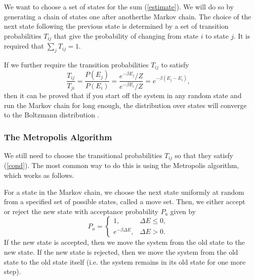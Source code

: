 \documentclass[11pt]{article}
\begin{document}
We want to choose a set of states for the sum (\ref{estimate}). We will do so by generating a chain of states one after another\textemdash the Markov chain. The choice of the next state following the previous state is determined by a set of transition probabilities $T_{ij}$ that give the probability of changing from state $i$ to state $j$. It is required that $\sum_j T_{ij} = 1$. 

If we further require the transition probabilities $T_{ij}$ to satisfy
\begin{equation}\label{cond}
    \frac{T_{ij}}{T_{ji}} = \frac{P(E_j)}{P(E_i)} = \frac{e^{-\beta E_j} / Z}{e^{-\beta E_i} / Z} = e^{-\beta (E_j - E_i)},
\end{equation}
then it can be proved that if you start off the system in any random state and run the Markov chain for long enough, the distribution over states will converge to the Boltzmann distribution \cite{newman2013computational}.

\subsubsection{The Metropolis Algorithm}
We still need to choose the transitional probabilities $T_{ij}$ so that they satisfy (\ref{cond}). The most common way to do this is using the Metropolis algorithm, which works as follows.

For a state in the Markov chain, we choose the next state uniformly at random from a specified set of possible states, called a move set. Then, we either accept or reject the new state with acceptance probability $P_a$ given by
\begin{equation}\label{acceptprob}
    P_a = \begin{cases}
        1, & \Delta E \leq 0, \\
        e^{-\beta \Delta E}, & \Delta E > 0.
    \end{cases}
\end{equation}
If the new state is accepted, then we move the system from the old state to the new state. If the new state is rejected, then we move the system from the old state to the old state itself (i.e. the system remains in its old state for one more step). 
\end{document}
